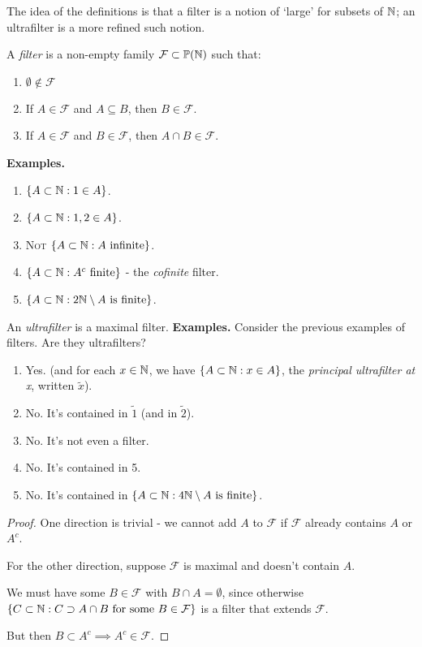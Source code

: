 \documentclass[10pt,a4paper]{article}
\begin{document}
The idea of the definitions is that a filter is a notion of `large' for subsets of $\mathbb{N}$; an ultrafilter is a more refined such notion.

A \emph{filter} is a non-empty family $\mathcal{F}\subset \mathbb{P}(\mathbb{N})$ such that:
\begin{enumerate}
  \item $\emptyset \notin \mathcal{F}$
  \item If $A \in \mathcal{F}$ and $A \subseteq B$, then $B \in \mathcal{F}$.
  \item If $A \in \mathcal{F}$ and $B \in \mathcal{F}$, then $A \cap B \in \mathcal{F}$.
\end{enumerate}
\textbf{Examples.}
\begin{enumerate}
  \item $\{A \subset \mathbb{N}: 1 \in A\}$.
  \item $\{A \subset \mathbb{N}: 1,2 \in A\}$.
  \item \textsc{Not} $\{A \subset \mathbb{N}: A \text{ infinite}\}$.
  \item $\{A \subset \mathbb{N}: A^c \text{ finite}\}$ - the \emph{cofinite} filter.
  \item $\{A \subset \mathbb{N}: 2\mathbb{N} \setminus A \text{ is finite}\}$.
\end{enumerate}
An \emph{ultrafilter} is a maximal filter.
\textbf{Examples.} Consider the previous examples of filters. Are they ultrafilters?
\begin{enumerate}
  \item Yes. (and for each $x \in \mathbb{N}$, we have $\{A \subset \mathbb{N}: x\in A\}$, the \emph{principal ultrafilter at x}, written $\tilde{x}$).
  \item No. It's contained in $\tilde{1}$ (and in $\tilde{2}$).
  \item No. It's not even a filter.
  \item No. It's contained in 5.
  \item No. It's contained in $\{A \subset \mathbb{N}: 4\mathbb{N} \setminus A \text{ is finite}\}$.
\end{enumerate}
\begin{proposition}
\end{proposition}
\begin{proof}
  One direction is trivial - we cannot add $A$ to $\mathcal{F}$ if $\mathcal{F}$ already contains $A$ or $A^c$.

  For the other direction, suppose $\mathcal{F}$ is maximal and doesn't contain $A$.

  We must have some $B \in \mathcal{F}$ with $B \cap A = \emptyset$, since otherwise $\{C \subset \mathbb{N}: C\supset A \cap B \text{ for some }B \in \mathcal{F}\}$ is a filter that extends $\mathcal{F}$.

  But then $B \subset A^c \implies A^c \in \mathcal{F}$.
\end{proof}
\end{document}
